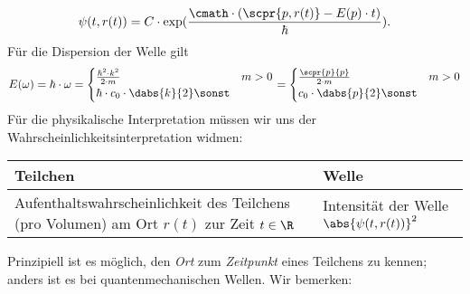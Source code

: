 \documentclass{article}
\begin{document}
        \[\psi(t,r(t)) = C\cdot\exp(\frac{\cmath\cdot (\scpr{p,r(t)}-E(p)\cdot t)}{\hbar}).\]
        Für die Dispersion der Welle gilt 
        \[E(\omega) = \hbar\cdot\omega = \begin{cases}
            \frac{\hbar^2\cdot k^2}{2\cdot m} & m>0 \\
            \hbar\cdot c_0\cdot \dabs{k}{2} \sonst
        \end{cases} = \begin{cases}
            \frac{\scpr{p}{p}}{2\cdot m} & m>0 \\
            c_0\cdot\dabs{p}{2} \sonst
        \end{cases}\]
        Für die physikalische Interpretation müssen wir uns der Wahrscheinlichkeitsinterpretation widmen: 
        \begin{table}[H]
            \centering
            \begin{tabular}{p{5cm}|p{5cm}}
                Teilchen & Welle \\
                \hline
                Aufenthaltswahrscheinlichkeit des Teilchens (pro Volumen) am Ort $r(t)$ zur Zeit $t\in\R$ & Intensität der Welle $\abs{\psi(t,r(t))}^2$ \\
            \end{tabular}
        \end{table}
        \noindent Prinzipiell ist es möglich, den \emph{Ort} zum \emph{Zeitpunkt} eines Teilchens zu kennen; anders ist es bei quantenmechanischen Wellen. Wir bemerken:
\end{document}
